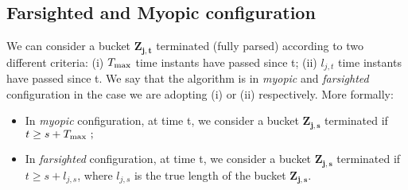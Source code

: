 \subsection{Farsighted and Myopic configuration}

We can consider a bucket $\boldsymbol{Z_{j,t}}$ terminated (fully parsed) according to two different criteria: (i) $T_{\textnormal{max}}$ time instants have passed since t; (ii) $l_{j,t}$ time instants have passed since t. We say that the algorithm is in \emph{myopic} and \emph{farsighted} configuration in the case we are adopting (i) or (ii) respectively. More formally:
\begin{itemize}
	\item In \emph{myopic} configuration, at time t, we consider a bucket $\boldsymbol{Z_{j,s}}$ terminated if $t\geq s+\Tmax \ ;$
	\item In \emph{farsighted} configuration, at time t, we consider a bucket $\boldsymbol{Z_{j,s}}$ terminated if $t \geq s+l_{j,s}$, where $l_{j,s}$ is the true length of the bucket $\boldsymbol{Z_{j,s}}$.
	
\end{itemize}

%	
%	
%	


